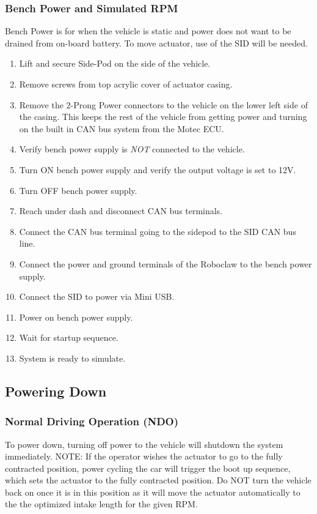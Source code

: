 \documentclass{article}
\begin{document}
\subsubsection{Bench Power and Simulated RPM}
Bench Power is for when the vehicle is static and power does not want to be drained from on-board battery. To move actuator, use of the SID will be needed.
\begin{enumerate}
    \item Lift and secure Side-Pod on the side of the vehicle.
    \item Remove screws from top acrylic cover of actuator casing.
    \item Remove the 2-Prong Power connectors to the vehicle on the lower left side of the casing. This keeps the rest of the vehicle from getting power and turning on the built in CAN bus system from the Motec ECU.
    \item Verify bench power supply is \textit{NOT} connected to the vehicle.
    \item Turn ON bench power supply and verify the output voltage is set to 12V.
    \item Turn OFF bench power supply.
    \item Reach under dash and disconnect CAN bus terminals.
    \item Connect the CAN bus terminal going to the sidepod to the SID CAN bus line.
    \item Connect the power and ground terminals of the Roboclaw to the bench power supply.
    \item Connect the SID to power via Mini USB.
    \item Power on bench power supply.
    \item Wait for startup sequence.
    \item System is ready to simulate.
\end{enumerate}

\subsection{Powering Down}
\subsubsection{Normal Driving Operation (NDO)}
To power down, turning off power to the vehicle will shutdown the system immediately. 
\newline \newline 
NOTE: If the operator wishes the actuator to go to the fully contracted position, power cycling the car will trigger the boot up sequence, which sets the actuator to the fully contracted position. Do NOT turn the vehicle back on once it is in this position as it will move the actuator automatically to the the optimized intake length for the given RPM.
\end{document}
